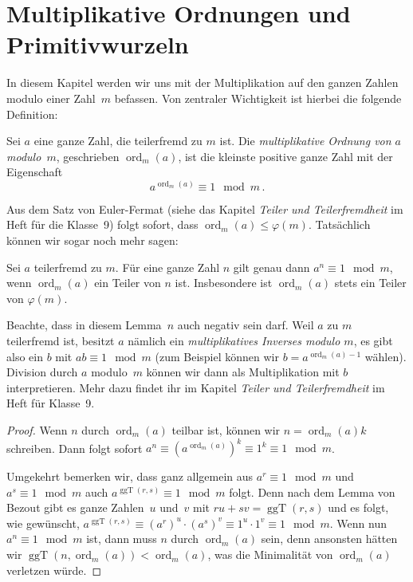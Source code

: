 \section{Multiplikative Ordnungen und Primitivwurzeln}\label{kapitel:Ordnung}

In diesem Kapitel werden wir uns mit der Multiplikation auf den ganzen Zahlen modulo einer Zahl~$m$ befassen. Von zentraler Wichtigkeit ist hierbei die folgende Definition:
\begin{definition}
	Sei $a$ eine ganze Zahl, die teilerfremd zu $m$ ist. Die \emph{multiplikative Ordnung von $a$ modulo~$m$}, geschrieben $\operatorname{ord}_m(a)$, ist die kleinste positive ganze Zahl mit der Eigenschaft
	\begin{equation*}
		a^{\operatorname{ord}_m(a)}\equiv 1\mod m\,.
	\end{equation*}
\end{definition}
Aus dem Satz von Euler-Fermat (siehe das Kapitel \emph{Teiler und Teilerfremdheit} im Heft für die Klasse~9) folgt sofort, dass $\operatorname{ord}_m(a)\leqslant\varphi(m)$. Tatsächlich können wir sogar noch mehr sagen:
\begin{satzmitnamen}[Lemma]
	Sei $a$ teilerfremd zu $m$. Für eine ganze Zahl $n$ gilt genau dann $a^n\equiv 1\mod m$, wenn $\operatorname{ord}_m(a)$ ein Teiler von $n$ ist. Insbesondere ist $\operatorname{ord}_m(a)$ stets ein Teiler von $\varphi(m)$.
\end{satzmitnamen}
Beachte, dass in diesem Lemma~$n$ auch negativ sein darf. Weil $a$ zu $m$ teilerfremd ist, besitzt $a$ nämlich ein \emph{multiplikatives Inverses modulo $m$}, es gibt also ein $b$ mit $ab\equiv 1\mod m$ (zum Beispiel können wir $b=a^{\operatorname{ord}_m(a)-1}$ wählen). Division durch $a$ modulo~$m$ können wir dann als Multiplikation mit $b$ interpretieren. Mehr dazu findet ihr im Kapitel \emph{Teiler und Teilerfremdheit} im Heft für Klasse~9.

\begin{proof}
	Wenn $n$ durch $\operatorname{ord}_m(a)$ teilbar ist, können wir $n=\operatorname{ord}_m(a)k$ schreiben. Dann folgt sofort $a^n\equiv (a^{\operatorname{ord}_m(a)})^k\equiv 1^k\equiv 1\mod m$.
	
	Umgekehrt bemerken wir, dass ganz allgemein aus $a^r\equiv 1\mod m$ und $a^s\equiv 1\mod m$ auch $a^{\operatorname{ggT}(r,s)}\equiv 1\mod m$ folgt. Denn nach dem Lemma von Bezout gibt es ganze Zahlen~$u$ und~$v$ mit $ru+sv=\operatorname{ggT}(r,s)$ und es folgt, wie gewünscht, $a^{\operatorname{ggT}(r,s)}\equiv (a^r)^u\cdot (a^s)^v\equiv 1^u\cdot 1^v\equiv 1\mod m$. Wenn nun $a^n\equiv 1\mod m$ ist, dann muss $n$ durch $\operatorname{ord}_m(a)$ sein, denn ansonsten hätten wir $\operatorname{ggT}(n,\operatorname{ord}_m(a))<\operatorname{ord}_m(a)$, was die Minimalität von $\operatorname{ord}_m(a)$ verletzen würde.
\end{proof}

